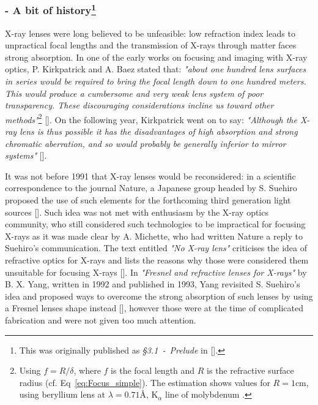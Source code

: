 \begin{refsection}
\subsubsection*{- A bit of history\footnote{This was originally published as \textit{§3.1~-~Prelude} in [\cite{Celestre2017}].}}
X-ray lenses were long believed to be unfeasible: low refraction index leads to unpractical focal lengths and the transmission of X-rays through matter faces strong absorption. In one of the early works on focusing and imaging with X-ray optics, P. Kirkpatrick and A. Baez stated that: \textit{"about one hundred lens surfaces in series would be required to bring the focal length down to one hundred meters. This would produce a cumbersome and very weak lens system of poor transparency. These discouraging considerations incline us toward other methods"}\footnote{Using $f=R/\delta$, where $f$ is the focal length and $R$ is the refractive surface radius (cf. Eq~\ref{eq:Focus_simple}). The estimation shows values for $R=1$cm, using beryllium lens at $\lambda=0.71$\r{A}, K$_{\alpha}$ line of molybdenum \cite{Kirkpatrick1948}.} [\cite{Kirkpatrick1948}]. On the following year, Kirkpatrick went on to say: \textit{"Although the X-ray lens is thus possible it has the disadvantages of high absorption and strong chromatic aberration, and so would probably be generally inferior to mirror systems"} [\cite{Kirkpatrick1949}]. 

It was not before 1991 that X-ray lenses would be reconsidered: in a scientific correspondence to the journal Nature, a Japanese group headed by S. Suehiro proposed the use of such elements for the forthcoming third generation light sources [\cite{Suehiro1991}]. Such idea was not met with enthusiasm by the X-ray optics community, who still considered such technologies to be impractical for focusing X-rays as it was made clear by A. Michette, who had written Nature a reply to Suehiro's communication. The text entitled \textit{"No X-ray lens"} criticises the idea of refractive optics for X-rays and lists the reasons why those were considered them unsuitable for focusing X-rays [\cite{Michette1991}]. In \textit{"Fresnel and refractive lenses for X-rays"} by B. X. Yang, written in 1992 and published in 1993, Yang revisited S. Suehiro's idea and proposed ways to overcome the strong absorption of such lenses by using a Fresnel lenses shape instead [\cite{Yang1993}], however those were at the time of complicated fabrication and were not given too much attention. 


\end{refsection}
